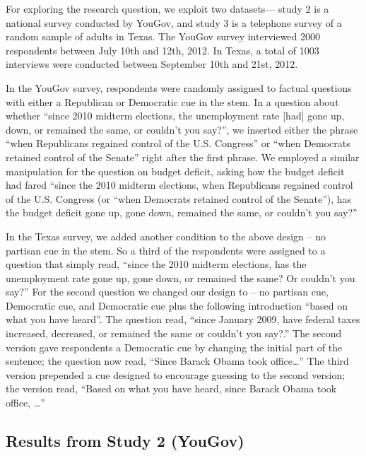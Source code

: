 \documentclass[12pt, letterpaper]{article}
\begin{document}
For exploring the research question, we exploit two datasets--- study 2 is a national survey conducted by YouGov, and study 3 is a telephone survey of a random sample of adults in Texas. The YouGov survey interviewed 2000 respondents between July 10th and 12th, 2012.  In Texas, a total of 1003 interviews were conducted between September 10th and 21st, 2012.

In the YouGov survey, respondents were randomly assigned to factual questions with either a Republican or Democratic cue in the stem. In a question about whether ``since 2010 midterm elections, the unemployment rate [had] gone up, down, or remained the same, or couldn't you say?'', we inserted either the phrase “when Republicans regained control of the U.S. Congress'' or ``when Democrats retained control of the Senate” right after the first phrase. We employed a similar manipulation for the question on budget deficit, asking how the budget deficit had fared “since the 2010 midterm elections, when Republicans regained control of the U.S. Congress (or ``when Democrats retained control of the Senate''), has the budget deficit gone up, gone down, remained the same, or couldn't you say?''

In the Texas survey, we added another condition to the above design – no partisan cue in the stem. So a third of the respondents were assigned to a question that simply read, ``since the 2010 midterm elections, has the unemployment rate gone up, gone down, or remained the same?  Or couldn’t you say?'' For the second question we changed our design to – no partisan cue, Democratic cue, and Democratic cue plus the following introduction “based on what you have heard”. The question read, ``since January 2009, have federal taxes increased, decreased, or remained the same or couldn’t you say?.'' The second version gave respondents a Democratic cue by changing the initial part of the sentence; the question now read, “Since Barack Obama took office\ldots''  The third version prepended a cue designed to encourage guessing to the second version; the version read, “Based on what you have heard, since Barack Obama took office, \ldots''


\subsection*{Results from Study 2 (YouGov)}
\end{document}
